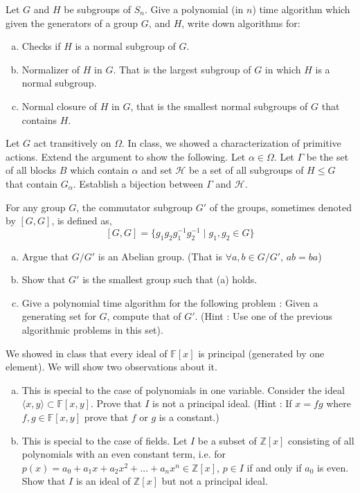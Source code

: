 \begin{ps1}
Let $G$ and $H$ be subgroups of $S_n$. Give a polynomial (in $n$) time algorithm which given the generators of a group $G$, and $H$, write down algorithms for:
\begin{enumerate}[(a)]
\item Checks if $H$ is a normal subgroup of $G$.
\item Normalizer of $H$ in $G$. That is the largest subgroup of $G$ in which $H$ is a normal subgroup.
\item Normal closure of $H$ in $G$, that is the smallest normal subgroups of $G$ that contains $H$.
\end{enumerate}
\end{ps1}


\begin{ps1}
Let $G$ act transitively on $\Omega$. In class, we showed a characterization of primitive actions. Extend the argument to show the following. Let $\alpha \in \Omega$. Let $\Gamma$ be the set of all blocks $B$ which contain $\alpha$ and set $\mathcal{H}$ be a set of all subgroups of $H \le G$ that contain $G_\alpha$. Establish a bijection between $\Gamma$ and $\mathcal{H}$.
\end{ps1}

\begin{ps1}
For any group $G$, the commutator subgroup $G'$ of the groups, sometimes denoted by $[G,G]$, is defined as,
\[ [G,G] = \{g_1g_2g_1^{-1}g_2^{-1} \mid g_1, g_2 \in G \} \]
\begin{enumerate}[(a)]
\item Argue that $G/G'$ is an Abelian group. (That is $\forall a,b \in G/G'$, $ab = ba$)
\item Show that $G'$ is the smallest group such that (a) holds.
\item Give a polynomial time algorithm for the following problem : Given a generating set for $G$, compute that of $G'$. (Hint : Use one of the previous algorithmic problems in this set).
\end{enumerate}
\end{ps1}


\begin{ps2}
We showed in class that every ideal of $\mathbb{F}[x]$ is principal (generated by one element). We will show two observations about it.
\begin{enumerate}[(a)]
\item This is special to the case of polynomials in one variable. Consider the ideal $\langle x,y \rangle \subset \mathbb{F}[x,y]$. Prove that $I$ is not a principal ideal. (Hint : If $x = fg$ where $f,g \in \mathbb{F}[x,y]$ prove that $f$ or $g$ is a constant.)
\item This is special to the case of fields. Let $I$ be a subset of $\mathbb{Z}[x]$ consisting of all polynomials with an even constant term, i.e. for $p(x) = a_0 + a_1x+a_2x^2+\ldots+a_nx^n \in \mathbb{Z}[x]$, $p \in I$ if and only if $a_0$ is even. Show that $I$ is an ideal of $\mathbb{Z}[x]$ but not a principal ideal.
\end{enumerate}
\end{ps2}

